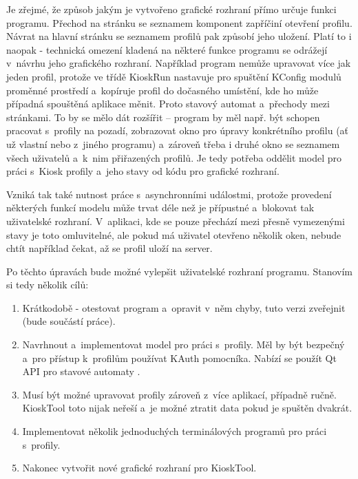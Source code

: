 Je zřejmé, že způsob jakým je vytvořeno grafické rozhraní přímo určuje funkci programu. Přechod na stránku se seznamem komponent zapříčiní otevření profilu. Návrat na hlavní stránku se seznamem profilů pak způsobí jeho uložení. Platí to i naopak - technická omezení kladená na některé funkce programu se odrážejí v~návrhu jeho grafického rozhraní. Například program nemůže upravovat více jak jeden profil, protože ve třídě KioskRun nastavuje pro spuštění KConfig modulů proměnné prostředí a~kopíruje profil do dočasného umístění, kde ho může případná spouštěná aplikace měnit. Proto stavový automat a~přechody mezi stránkami. To by se mělo dát rozšířit -- program by měl např. být schopen pracovat s~profily na pozadí, zobrazovat okno pro úpravy konkrétního profilu (ať už vlastní nebo z~jiného programu) a~zároveň třeba i druhé okno se seznamem všech uživatelů a~k~nim přiřazených profilů. Je tedy potřeba oddělit model pro práci s~Kiosk profily a~jeho stavy od kódu pro grafické rozhraní.

Vzniká tak také nutnost práce s~asynchronními událostmi, protože provedení některých funkcí modelu může trvat déle než je přípustné a~blokovat tak uživatelské rozhraní. V~aplikaci, kde se pouze přechází mezi přesně vymezenými stavy je toto omluvitelné, ale pokud má uživatel otevřeno několik oken, nebude chtít například čekat, až se profil uloží na server.

Po těchto úpravách bude možné vylepšit uživatelské rozhraní programu. Stanovím si tedy několik cílů:
\begin{enumerate}
\item Krátkodobě - otestovat program a~opravit v~něm chyby, tuto verzi zveřejnit (bude součástí práce).
\item Navrhnout a~implementovat model pro práci s~profily. Měl by být bezpečný a~pro přístup k~profilům používat KAuth pomocníka. Nabízí se použít Qt API pro stavové automaty \cite{QtStatMach}.
\item Musí být možné upravovat profily zároveň z~více aplikací, případně ručně. KioskTool toto nijak neřeší a~je možné ztratit data pokud je spuštěn dvakrát.
\item Implementovat několik jednoduchých terminálových programů pro práci s~profily.
\item Nakonec vytvořit nové grafické rozhraní pro KioskTool.
\end{enumerate}

